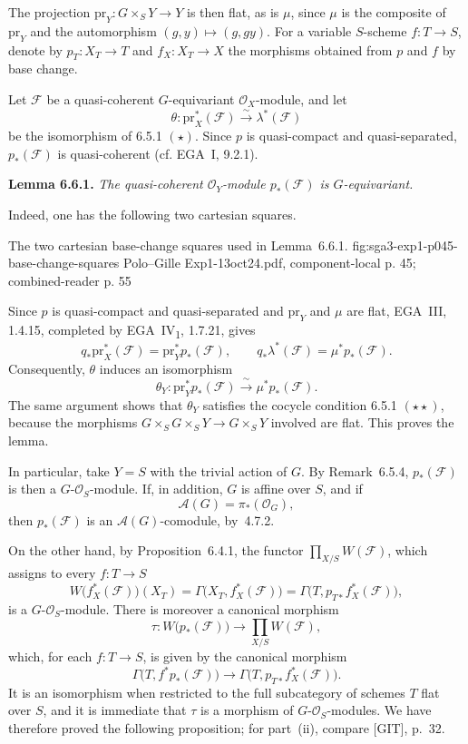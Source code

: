 The projection \(\mathrm{pr}_Y:G\times_SY\to Y\) is then flat, as is
\(\mu\), since \(\mu\) is the composite of \(\mathrm{pr}_Y\) and the
automorphism \((g,y)\mapsto(g,gy)\). For a variable \(S\)-scheme
\(f:T\to S\), denote by \(p_T:X_T\to T\) and \(f_X:X_T\to X\) the
morphisms obtained from \(p\) and \(f\) by base change.

Let \(\mathcal F\) be a quasi-coherent \(G\)-equivariant
\(\mathcal O_X\)-module, and let
\[
  \theta:\mathrm{pr}_X^*(\mathcal F)
  \xrightarrow{\ \sim\ }\lambda^*(\mathcal F)
\]
be the isomorphism of 6.5.1 \((\star)\). Since \(p\) is quasi-compact
and quasi-separated, \(p_*(\mathcal F)\) is quasi-coherent
(cf. EGA~I, 9.2.1).

\medskip
\noindent\textbf{Lemma 6.6.1.}
\textit{The quasi-coherent \(\mathcal O_Y\)-module
\(p_*(\mathcal F)\) is \(G\)-equivariant.}

Indeed, one has the following two cartesian squares.

  {The two cartesian base-change squares used in Lemma~6.6.1.}
  {fig:sga3-exp1-p045-base-change-squares}
  {Polo--Gille Exp1-13oct24.pdf, component-local p. 45; combined-reader p. 55}

Since \(p\) is quasi-compact and quasi-separated and
\(\mathrm{pr}_Y\) and \(\mu\) are flat, EGA~III, 1.4.15, completed by
EGA~IV\textsubscript{1}, 1.7.21, gives
\[
  q_*\mathrm{pr}_X^*(\mathcal F)
    =\mathrm{pr}_Y^*p_*(\mathcal F),
  \qquad
  q_*\lambda^*(\mathcal F)
    =\mu^*p_*(\mathcal F).
\]
Consequently, \(\theta\) induces an isomorphism
\[
  \theta_Y:\mathrm{pr}_Y^*p_*(\mathcal F)
  \xrightarrow{\ \sim\ }\mu^*p_*(\mathcal F).
\]
The same argument shows that \(\theta_Y\) satisfies the cocycle
condition 6.5.1 \((\star\star)\), because the morphisms
\(G\times_SG\times_SY\to G\times_SY\) involved are flat. This proves
the lemma.

In particular, take \(Y=S\) with the trivial action of \(G\). By
Remark~6.5.4, \(p_*(\mathcal F)\) is then a
\(G\)-\(\mathcal O_S\)-module. If, in addition, \(G\) is affine over
\(S\), and if
\[
  \mathscr A(G)=\pi_*(\mathcal O_G),
\]
then \(p_*(\mathcal F)\) is an \(\mathscr A(G)\)-comodule, by~4.7.2.

On the other hand, by Proposition~6.4.1, the functor
\(\prod_{X/S}W(\mathcal F)\), which assigns to every \(f:T\to S\)
\[
  W\bigl(f_X^*(\mathcal F)\bigr)(X_T)
  =\Gamma\bigl(X_T,f_X^*(\mathcal F)\bigr)
  =\Gamma\bigl(T,p_{T*}f_X^*(\mathcal F)\bigr),
\]
is a \(G\)-\(\mathcal O_S\)-module. There is moreover a canonical
morphism
\[
  \tau:W\bigl(p_*(\mathcal F)\bigr)
  \longrightarrow\prod_{X/S}W(\mathcal F),
\]
which, for each \(f:T\to S\), is given by the canonical morphism
\[
  \Gamma\bigl(T,f^*p_*(\mathcal F)\bigr)
  \longrightarrow
  \Gamma\bigl(T,p_{T*}f_X^*(\mathcal F)\bigr).
\]
It is an isomorphism when restricted to the full subcategory of schemes
\(T\) flat over \(S\), and it is immediate that \(\tau\) is a morphism
of \(G\)-\(\mathcal O_S\)-modules. We have therefore proved the
following proposition; for part~(ii), compare [GIT], p.~32.

